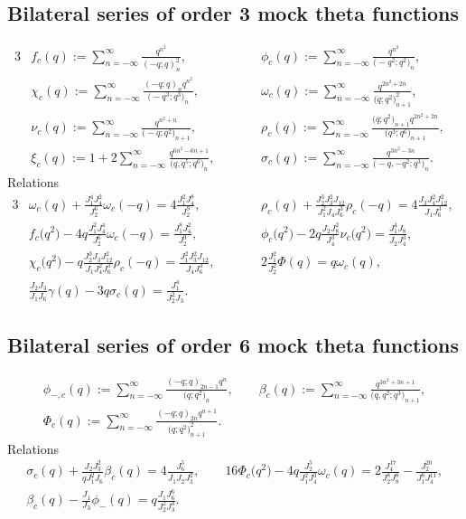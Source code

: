 \documentclass[10pt,a4paper]{amsart}
\numberwithin{equation}{section}
\begin{document}
\subsection{Bilateral series of order 3 mock theta functions}
\begin{alignat*}{3}
& f_c(q):= \sum_{n=-\infty}^{\infty}\frac{q^{n^2}}{(-q;q)_n^2},\qquad&&
 \phi_c(q):= \sum_{n=-\infty}^{\infty}\frac{q^{n^2}}{\bigl(-q^2;q^2\bigr)_n},&\\
&\chi_c(q):= \sum_{n=-\infty}^{\infty}\frac{(-q;q)_nq^{n^2}}{\bigl(-q^3;q^3\bigr)_n},\qquad&&
 \omega_c(q):= \sum_{n=-\infty}^{\infty}\frac{q^{2n^2+2n}}{\bigl(q;q^2\bigr)_{n+1}^2},&\\
&\nu_c(q):= \sum_{n=-\infty}^{\infty}\frac{q^{n^2+n}}{\bigl(-q;q^2\bigr)_{n+1}},\qquad&&
 \rho_c(q):= \sum_{n=-\infty}^{\infty}\frac{\bigl(q;q^2\bigr)_{n+1}q^{2n^2+2n}}{\bigl(q^3;q^6\bigr)_{n+1}},&\\
&\xi_c(q):= 1+2\sum_{n=-\infty}^{\infty}\frac{q^{6n^2-6n+1}}{\bigl(q,q^5;q^6\bigr)_n},\qquad&&
 \sigma_c(q):= \sum_{n=-\infty}^{\infty}\frac{q^{3n^2-3n}}{\bigl(-q,-q^2;q^3\bigr)_n}.&
\end{alignat*}
Relations
\begin{alignat*}{3}
 &\omega_c(q)+\frac{J_1^4J_4^2}{J_2^6}\omega_c(-q)=4\frac{J_1^2J_4^8}{J_2^9}, \qquad&&
 \rho_c(q)+\frac{J_2^3J_3^2J_{12}}{J_1^2J_4J_6^3}\rho_c(-q)=4\frac{J_3J_4^2J_{12}^2}{J_1J_6^3},&\\
& f_c\bigl(q^2\bigr)-4q\frac{J_1^2J_4^4}{J_2^6}\omega_c(-q)
=\frac{J_1^8J_4^2}{J_2^9},\qquad&&
 \phi_c\bigl(q^2\bigr)-2q\frac{J_2J_8^2}{J_4^3}\nu_c\bigl(q^2\bigr)
=\frac{J_1^4J_8}{J_2J_4^3}, &\\
& \chi_c\bigl(q^2\bigr)-q\frac{J_2^3J_3J_{12}^2}{J_1J_4^2J_6^3}\rho_c(-q)
=\frac{J_1^2J_3^2J_{12}}{J_4J_6^3},\qquad&&
 2\frac{J_1^2}{J_2^2}\varPhi(q)=q\omega_c(q),&\\
& \frac{J_2J_3}{J_1J_6}\gamma(q)-3q\sigma_c(q)=\frac{J_1^4}{J_2^2J_3}.&&&
\end{alignat*}

\subsection{Bilateral series of order 6 mock theta functions}
\begin{gather*}
\phi_{-,c}(q):= \sum_{n=-\infty}^{\infty}\frac{(-q;q)_{2n-1}q^n}{\bigl(q;q^2\bigr)_n},\qquad
 \beta_c(q):= \sum_{n=-\infty}^{\infty}\frac{q^{3n^2+3n+1}}{\bigl(q,q^2;q^3\bigr)_{n+1}},\\
\varPhi_c(q):= \sum_{n=-\infty}^{\infty}\frac{(-q;q)_{2n}q^{n+1}}{\bigl(q;q^2\bigr)_{n+1}^2}.
\end{gather*}
Relations
\begin{gather*}
  \sigma_c(q)+\frac{J_2J_3^2}{qJ_1^2J_6}\beta_c(q)=4\frac{J_6^5}{J_1J_2J_3^2},\qquad
 16\varPhi_c\bigl(q^2\bigr)-4q\frac{J_2^5}{J_1^2J_4^3}\omega_c(q)
=2\frac{J_4^{17}}{J_2^8J_8^8}-\frac{J_2^{20}}{J_1^8J_4^{11}},\\
 \beta_c(q)-\frac{J_1}{J_3}\phi_-(q)=q\frac{J_1J_6^6}{J_2^2J_3^4}.
\end{gather*}
\end{document}

